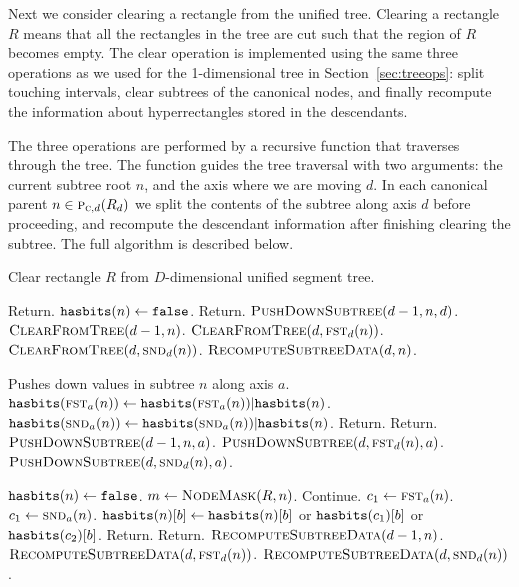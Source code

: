 \documentclass[english,gradu]{tktltiki2018}
\begin{document}
Next we consider clearing a rectangle from the unified tree.
Clearing a rectangle $R$ means that all the rectangles in the tree are cut such that the region of $R$ becomes empty.
The clear operation is implemented using the same three operations as we used for the 1-dimensional tree in Section~\ref{sec:treeops}:
split touching intervals, clear subtrees of the canonical nodes, and finally recompute the information about hyperrectangles stored in the descendants.

The three operations are performed by a recursive function \cleardt that traverses through the tree.
The function guides the tree traversal with two arguments: the current subtree root $n$, and the axis where we are moving $d$.
In each canonical parent $n\in\canonpari{R_d}{d}$ we split the contents of the subtree along axis $d$ before proceeding, and recompute the descendant information after finishing clearing the subtree.
The full algorithm is described below.

\begin{alg}\label{alg:segurm}
Clear rectangle $R$ from $D$-dimensional unified segment tree.
\begin{algorithmic}
		\State Return.
	\EndIf
		\State $\hasbita{n}\gets\texttt{false}$.
		\State Return.
	\EndIf
		\State $\pdst(d-1,n,d)$.
	\EndIf
	\State $\cleardt(d-1,n)$.
		\State $\cleardt(d,\leftu{n}{d})$.
		\State $\cleardt(d,\rightu{n}{d})$.
	\EndIf
		\State $\recomp(d,n)$.
	\EndIf
\EndProcedure

	\Comment Pushes down values in subtree $n$ along axis $a$.
		\State $\hasbita{\leftu{n}{a}}\gets \hasbita{\leftu{n}{a}} | \hasbita{n}$.
		\State $\hasbita{\rightu{n}{a}}\gets \hasbita{\rightu{n}{a}} | \hasbita{n}$.
		\State Return.
		\State Return.
	\EndIf
	\State $\pdst(d-1,n,a)$.
		\State $\pdst(d,\leftu{n}{d},a)$.
		\State $\pdst(d,\rightu{n}{d},a)$.
	\EndIf
\EndProcedure

		\State $\hasbita{n}\gets\texttt{false}$.
		\State $m\gets\maskof{R,n}$.
				Continue.
			\EndIf
			\State $c_1\gets\leftu{n}{a}$.
			\State $c_1\gets\rightu{n}{a}$.
					\State $\hasbits{n}{b}\gets \hasbits{n}{b}$ or $\hasbits{c_1}{b}$ or $\hasbits{c_2}{b}$.
				\EndIf
			\EndFor
		\EndFor
		\State Return.
		\State Return.
	\EndIf
	\State $\recomp(d-1,n)$.
		\State $\recomp(d,\leftu{n}{d})$.
		\State $\recomp(d,\rightu{n}{d})$.
	\EndIf
\EndProcedure
\end{algorithmic}
\end{alg}
\end{document}

